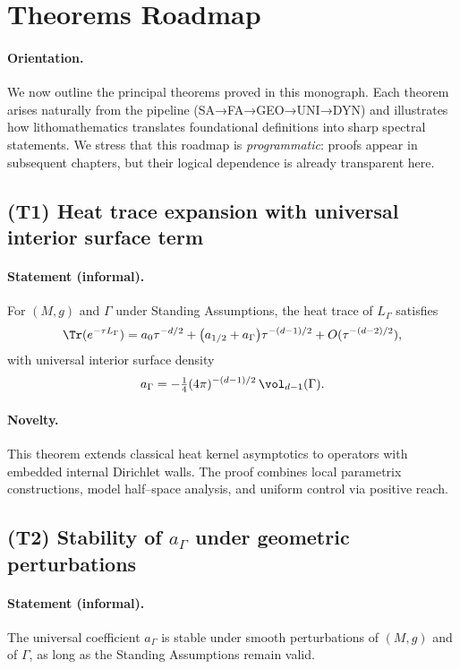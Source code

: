 \section{Theorems Roadmap}\label{sec:roadmap}

\paragraph{Orientation.}
We now outline the principal theorems proved in this monograph. 
Each theorem arises naturally from the pipeline (SA→FA→GEO→UNI→DYN) 
and illustrates how lithomathematics translates foundational definitions 
into sharp spectral statements. 
We stress that this roadmap is \emph{programmatic}: 
proofs appear in subsequent chapters, 
but their logical dependence is already transparent here.

\subsection{(T1) Heat trace expansion with universal interior surface term}

\paragraph{Statement (informal).}
For $(M,g)$ and $\Gamma$ under Standing Assumptions, 
the heat trace of $L_\Gamma$ satisfies
\[
\Tr(e^{-\tau L_\Gamma})
= a_0 \tau^{-d/2} 
+ \big(a_{1/2}+a_\Gamma\big)\tau^{-(d-1)/2}
+ O(\tau^{-(d-2)/2}),
\]
with universal interior surface density
\[
a_\Gamma = -\tfrac14 (4\pi)^{-(d-1)/2}\,\vol_{d-1}(\Gamma).
\]

\paragraph{Novelty.}
This theorem extends classical heat kernel asymptotics 
to operators with embedded internal Dirichlet walls.
The proof combines local parametrix constructions, model half–space analysis, 
and uniform control via positive reach.

\subsection{(T2) Stability of $a_\Gamma$ under geometric perturbations}

\paragraph{Statement (informal).}
The universal coefficient $a_\Gamma$ is stable under smooth perturbations of $(M,g)$ 
and of $\Gamma$, as long as the Standing Assumptions remain valid. 

